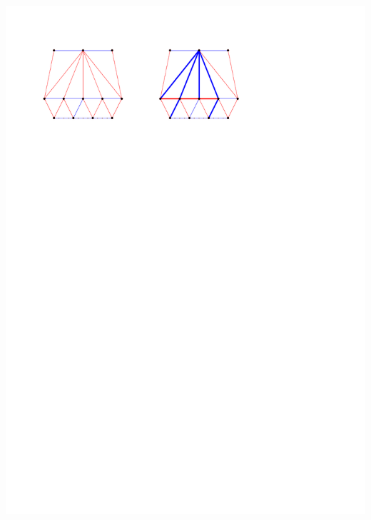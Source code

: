 \documentclass[a4paper]{article}
\begin{document}
\includegraphics[width = \textwidth]{topFanFlips/img/merge}
\clearpage%
\end{document}
